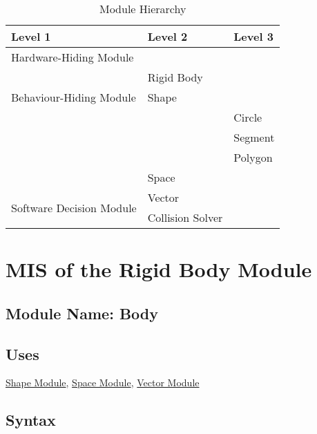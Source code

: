 \documentclass[12pt]{article}
\newcommand{\Shape}{\hyperref[MISShape]{Shape Module}}
\newcommand{\Space}{\hyperref[MISSpace]{Space Module}}
\newcommand{\Vector}{\hyperref[MISVector]{Vector Module}}
\newcommand{\Transform}{\hyperref[MISTransform]{Transform Matrix Module}}
\newcommand{\SpatialIndex}{\hyperref[MISSpatial]{Spatial Index Module}}
\newcommand{\Sequence}{\hyperref[MISSequence]{Sequence Data Structure Module}}
\begin{document}
\begin{table}[h!]
\centering
\begin{tabular}{p{} p{} p{}}
\toprule
\textbf{Level 1} & \textbf{Level 2}  & \textbf{Level 3} \\
\midrule
		
		
{Hardware-Hiding Module} & ~ \\
\midrule
		
\multirow{3}{0.3\textwidth}{Behaviour-Hiding Module}
& Rigid Body\\
& Shape\\
& &Circle \\
& &Segment \\
& &Polygon \\
& Space\\ 
\midrule
		
\multirow{3}{0.3\textwidth}{Software Decision Module} 
& Vector\\ 
&Collision Solver \\  
		
\bottomrule
		
		
		
	\end{tabular}
	
	\caption{Module Hierarchy}
	
	\label{TblMH}
	
\end{table}


\section{MIS of the Rigid Body Module} \label{MISBody}

\subsection{Module Name: Body} 

\subsection{Uses} \label{SecUBody}
	\Shape, \Space, \Vector %
	
\subsection{Syntax}
\end{document}
